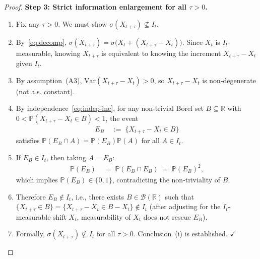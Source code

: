 \documentclass[12pt,openany]{book}
\newcommand{\calI}{\mathcal{I}}
\numberwithin{equation}{chapter}
\theoremstyle{plain}
\theoremstyle{definition}
\theoremstyle{remark}
\numberwithin{equation}{chapter}
\theoremstyle{plain}
\def\calI{I}%
\begin{document}
\begin{proof}
\medskip
\noindent\textbf{Step 3: Strict information enlargement for all
$\tau > 0$.}
\begin{enumerate}
  \item Fix any $\tau > 0$.  We must show
        $\sigma(X_{t+\tau}) \not\subseteq \calI_t$.
  \item By~\eqref{eq:decomp}, $\sigma(X_{t+\tau}) =
        \sigma\bigl(X_t + (X_{t+\tau} - X_t)\bigr)$.  Since
        $X_t$ is $\calI_t$-measurable, knowing $X_{t+\tau}$ is
        equivalent to knowing the increment $X_{t+\tau} - X_t$
        given $\calI_t$.
  \item By assumption~(A3), $\mathrm{Var}(X_{t+\tau} - X_t) > 0$,
        so $X_{t+\tau} - X_t$ is non-degenerate (not a.s.
        constant).
  \item By independence~\eqref{eq:indep-inc}, for any non-trivial
        Borel set $B \subseteq \mathbb{R}$ with
        $0 < \mathbb{P}(X_{t+\tau} - X_t \in B) < 1$, the event
        \begin{align}
          E_B
          &\;:=\; \{X_{t+\tau} - X_t \in B\}
          \label{eq:event-eb}
        \end{align}
        satisfies $\mathbb{P}(E_B \cap A) = \mathbb{P}(E_B)
        \mathbb{P}(A)$ for all $A \in \calI_t$.
  \item If $E_B \in \calI_t$, then taking $A = E_B$:
        \begin{align}
          \mathbb{P}(E_B)
          &\;=\; \mathbb{P}(E_B \cap E_B)
          \;=\; \mathbb{P}(E_B)^2,
          \label{eq:zero-one}
        \end{align}
        which implies $\mathbb{P}(E_B) \in \{0, 1\}$, contradicting
        the non-triviality of $B$.
  \item Therefore $E_B \notin \calI_t$, i.e., there exists
        $B \in \mathcal{B}(\mathbb{R})$ such that
        $\{X_{t+\tau} \in B\} = \{X_{t+\tau} - X_t \in B -
        X_t\} \notin \calI_t$ (after adjusting for the
        $\calI_t$-measurable shift $X_t$, measurability of $X_t$
        does not rescue $E_B$).
  \item Formally, $\sigma(X_{t+\tau}) \not\subseteq \calI_t$
        for all $\tau > 0$.  Conclusion~(i) is established.
        $\checkmark$
\end{enumerate}


\end{proof}
\end{document}
